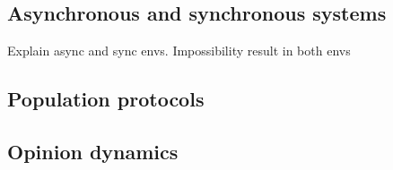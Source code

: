 \subsection{Asynchronous and synchronous systems}

Explain async and sync envs. Impossibility result in both envs

\subsection{Population protocols}



\subsection{Opinion dynamics}


